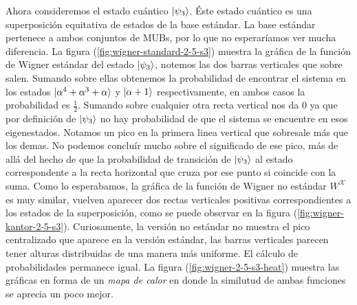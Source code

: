 \documentclass[a4paper]{report}
\begin{document}
  Ahora consideremos el estado cuántico $\ket{\psi_3}$. Éste
  estado cuántico es una superposición equitativa de estados
  de la base estándar. La base estándar pertenece a ambos
  conjuntos de MUBs, por lo que no esperaríamos ver mucha
  diferencia. La figura (\ref{fig:wigner-standard-2-5-s3})
  muestra la gráfica de la función de Wigner estándar del
  estado $\ket{\psi_3}$, notemos las dos barras verticales
  que sobre salen. Sumando sobre ellas obtenemos la
  probabilidad de encontrar el sistema en los estados
  $\ket{\alpha^{4}+\alpha^3 + \alpha}$ y $\ket{\alpha+1}$
  respectivamente, en ambos casos la probabilidad es
  $\frac{1}{2}$. Sumando sobre cualquier otra recta vertical
  nos da 0 ya que por definición de $\ket{\psi_3}$ no hay
  probabilidad de que el sistema se encuentre en esos
  eigenestados. Notamos un pico en la primera linea vertical
  que sobresale más que los demas. No podemos concluír mucho
  sobre el significado de ese pico, más de allá del hecho de
  que la probabilidad de transición de $\ket{\psi_3}$ al
  estado correspondente a la recta horizontal que cruza por
  ese punto si coincide con la suma. Como lo esperabamos, la
  gráfica de la función de Wigner no estándar $W^{\mathcal
  K}$ es muy similar, vuelven aparecer dos rectas verticales
  positivas correspondientes a los estados de la
  superposición, como se puede observar en la figura
  (\ref{fig:wigner-kantor-2-5-s3}). Curiosamente, la versión
  no estándar no muestra el pico centralizado que aparece en
  la versión estándar, las barras verticales parecen tener
  alturas distribuidas de una manera más uniforme. El
  cálculo de probabilidades permanece igual. La figura
  (\ref{fig:wigner-2-5-s3-heat}) muestra las gráficas en
  forma de un \textit{mapa de calor} en donde la similutud
  de ambas funciones se aprecia un poco mejor.
\end{document}
